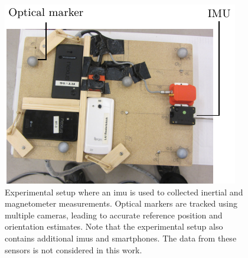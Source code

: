 \begin{figure}
    \centering
  \includegraphics[scale = 1]{figure4_2.pdf}
  \caption{Experimental setup where an \gls{imu} is used to collected inertial and magnetometer measurements. Optical markers are tracked using multiple cameras, leading to accurate reference position and orientation estimates. Note that the experimental setup also contains additional \glspl{imu} and smartphones. The data from these sensors is not considered in this work.}
  \label{fig:oriEst-expSetup}
\end{figure}

